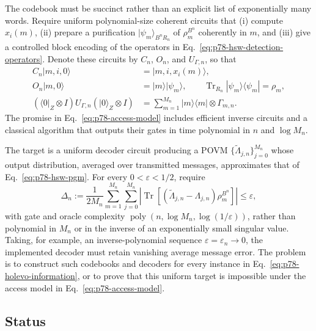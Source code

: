 The codebook must be succinct rather than an explicit list of exponentially
many words.  Require uniform polynomial-size coherent circuits that (i)
compute $x_i(m)$, (ii) prepare a purification $|\psi_m\rangle_{B^nR_n}$ of
$\rho_m^{B^n}$ coherently in $m$, and (iii) give a controlled block encoding
of the operators in Eq.~\eqref{eq:p78-hsw-detection-operators}.  Denote these
circuits by $C_n$, $O_n$, and $U_{\Gamma,n}$, so that
\begin{equation}
  \begin{aligned}
    C_n|m,i,0\rangle&=|m,i,x_i(m)\rangle,\\
    O_n|m,0\rangle&=|m\rangle|\psi_m\rangle,
      \qquad \operatorname{Tr}_{R_n}|\psi_m\rangle\!\langle\psi_m|=\rho_m,\\
    (\langle0|_Z\otimes I)U_{\Gamma,n}(|0\rangle_Z\otimes I)
      &=\sum_{m=1}^{M_n}|m\rangle\!\langle m|\otimes\Gamma_{m,n}.
  \end{aligned}
  \label{eq:p78-access-model}
\end{equation}
The promise in Eq.~\eqref{eq:p78-access-model} includes efficient inverse
circuits and a classical algorithm that outputs their gates in time
polynomial in $n$ and $\log M_n$.

The target is a uniform decoder circuit producing a POVM
$\{\widetilde\Lambda_{j,n}\}_{j=0}^{M_n}$ whose output distribution, averaged
over transmitted messages, approximates that of
Eq.~\eqref{eq:p78-hsw-pgm}.  For every $0<\varepsilon<1/2$, require
\begin{equation}
  \Delta_n
  :=\frac{1}{2M_n}\sum_{m=1}^{M_n}\sum_{j=0}^{M_n}
    \left|
      \operatorname{Tr}\!\left[
        (\widetilde\Lambda_{j,n}-\Lambda_{j,n})\rho_m^{B^n}
      \right]
    \right|
  \leq\varepsilon,
  \label{eq:p78-average-implementation-error}
\end{equation}
with gate and oracle complexity
$\operatorname{poly}(n,\log M_n,\log(1/\varepsilon))$, rather than polynomial
in $M_n$ or in the inverse of an exponentially small singular value.  Taking,
for example, an inverse-polynomial sequence $\varepsilon=\varepsilon_n\to0$,
the implemented decoder must retain vanishing average message error.  The
problem is to construct such codebooks and decoders for every instance in
Eq.~\eqref{eq:p78-holevo-information}, or to prove that this uniform target is
impossible under the access model in Eq.~\eqref{eq:p78-access-model}.

\subsection*{Status}

